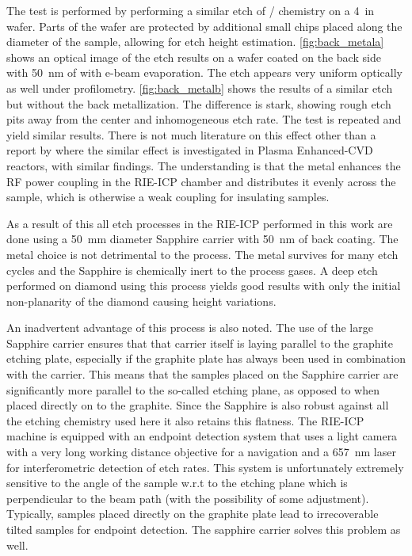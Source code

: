 The test is performed by performing a similar etch of / chemistry on a \qty{4}{in}  wafer. Parts of the wafer are protected by additional small  chips placed along the diameter of the sample, allowing for etch height estimation. \cref{fig:back_metala} shows an optical image of the etch results on a wafer coated on the back side with \qty{50}{\nano\meter} of  with e-beam evaporation. The etch appears very uniform optically as well under profilometry. \cref{fig:back_metalb} shows the results of a similar etch but without the back metallization. The difference is stark, showing rough etch pits away from the center and inhomogeneous etch rate. The test is repeated and yield similar results. There is not much literature on this effect other than a report by \citeauthor*{chengImprovingFrontSide2012} where the similar effect is investigated in Plasma Enhanced-\gls{CVD} reactors, with similar findings. The understanding is that the metal enhances the \gls{RF} power coupling in the \gls{RIE}-\gls{ICP} chamber and distributes it evenly across the sample, which is otherwise a weak coupling for insulating samples.

As a result of this all etch processes in the \gls{RIE}-\gls{ICP} performed in this work are done using a \qty{50}{\milli\meter} diameter Sapphire carrier with \qty{50}{\nano\meter} of  back coating. The metal choice is not detrimental to the process. The metal survives for many etch cycles and the Sapphire is chemically inert to the process gases. A deep etch performed on diamond using this process yields good results with only the initial non-planarity of the diamond causing height variations.

An inadvertent advantage of this process is also noted. The use of the large Sapphire carrier ensures that that carrier itself is laying parallel to the graphite etching plate, especially if the graphite plate has always been used in combination with the carrier. This means that the samples placed on the Sapphire carrier are significantly more parallel to the so-called etching plane, as opposed to when placed directly on to the graphite. Since the Sapphire is also robust against all the etching chemistry used here it also retains this flatness. The \gls{RIE}-\gls{ICP} machine is equipped with an endpoint detection system that uses a light camera with a very long working distance objective for a navigation and a \qty{657}{\nano\meter} laser for interferometric detection of etch rates. This system is unfortunately extremely sensitive to the angle of the sample w.r.t to the etching plane which is perpendicular to the beam path (with the possibility of some adjustment). Typically, samples placed directly on the graphite plate lead to irrecoverable tilted samples for endpoint detection. The sapphire carrier solves this problem as well.

